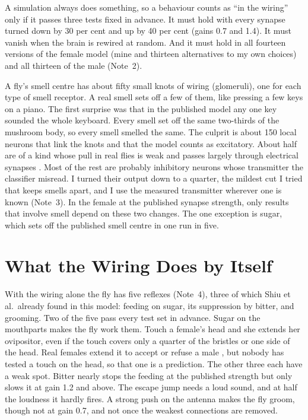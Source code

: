 \documentclass[11pt,a4paper]{article}
\newcommand{\note}[1]{(Note~#1)}
\begin{document}
A simulation always does something, so a behaviour counts as ``in the wiring'' only if it passes three tests fixed in advance. It must hold with every synapse turned down by 30 per cent and up by 40 per cent (gains 0.7 and 1.4). It must vanish when the brain is rewired at random. And it must hold in all fourteen versions of the female model (mine and thirteen alternatives to my own choices) and all thirteen of the male \note{2}.

A fly's smell centre has about fifty small knots of wiring (glomeruli), one for each type of smell receptor. A real smell sets off a few of them, like pressing a few keys on a piano. The first surprise was that in the published model any one key sounded the whole keyboard. Every smell set off the same two-thirds of the mushroom body, so every smell smelled the same. The culprit is about 150 local neurons that link the knots and that the model counts as excitatory. About half are of a kind whose pull in real flies is weak and passes largely through electrical synapses \citep{yaksi2010electrical}. Most of the rest are probably inhibitory neurons whose transmitter the classifier misread. I turned their output down to a quarter, the mildest cut I tried that keeps smells apart, and I use the measured transmitter wherever one is known \note{3}. In the female at the published synapse strength, only results that involve smell depend on these two changes. The one exception is sugar, which sets off the published smell centre in one run in five.

\section{What the Wiring Does by Itself}
\label{sec:reflexes}

With the wiring alone the fly has five reflexes \note{4}, three of which Shiu et al.\ already found in this model: feeding on sugar, its suppression by bitter, and grooming. Two of the five pass every test set in advance. Sugar on the mouthparts makes the fly work them. Touch a female's head and she extends her ovipositor, even if the touch covers only a quarter of the bristles or one side of the head. Real females extend it to accept or refuse a male \citep{mezzera2020ovipositor}, but nobody has tested a touch on the head, so that one is a prediction. The other three each have a weak spot. Bitter nearly stops the feeding at the published strength but only slows it at gain 1.2 and above. The escape jump needs a loud sound, and at half the loudness it hardly fires. A strong push on the antenna makes the fly groom, though not at gain 0.7, and not once the weakest connections are removed.
\end{document}
